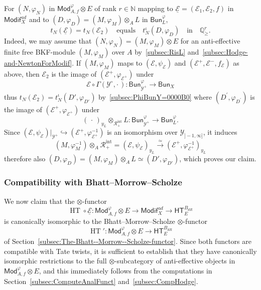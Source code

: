 \documentclass[11pt]{article}
\theoremstyle{definition}
\numberwithin{equation}{section}
\numberwithin{figure}{section}
\numberwithin{table}{section}
\newcommand{\Mod}{\mathsf{Mod}}
\newcommand{\Modif}{\mathsf{Modif}}
\newcommand{\HT}{\mathsf{HT}}
\newcommand{\Bun}{\mathsf{Bun}}
\DeclareMathOperator{\HTT}{HT}
\newcommand*{\dR}{dR}
\begin{document}
For $(N,\varphi_{N})$ in $\Mod_{A,f}^{\varphi}\otimes E$ of rank $r\in\mathbb{N}$ mapping to $\underline{\mathcal{E}}=(\mathcal{E}_{1},\mathcal{E}_{2},f)$ in $\Modif_{X}^{ad}$ and to $(D,\varphi_{D})=(M,\varphi_{M})\otimes_{A}L$ in $\Bun_{L}^{\varphi}$,
\[
t_{N}(\underline{\mathcal{E}})=t_{N}(\mathcal{E}_{2})\quad\text{equals}\quad t_{N}^{\iota}(D,\varphi_{D})\quad\text{in}\quad\mathbb{Q}_{\geq}^{r}.
\]
Indeed, we may assume that $(N,\varphi_{N})=(M,\varphi_{M})\otimes E$ for an anti-effective finite free BKF-module $(M,\varphi_{M})$ over $A$ by~\ref{subsec:RisL} and~\ref{subsec:Hodge-and-NewtonForModif}. If $(M,\varphi_{M})$ maps to $(\mathscr{E},\psi_{\mathscr{E}})$ and $(\mathscr{E}^{+},\mathscr{E}^{-},f_{\mathscr{E}})$ as above, then $\mathcal{E}_{2}$ is the image of $(\mathscr{E}^{+},\varphi_{\mathscr{E}^{+}})$ under
\[
\mathcal{E}\circ\Gamma(\mathscr{Y}^{\circ},{\cdot\,}):\Bun_{\mathscr{Y}^{+}}^{\varphi}\rightarrow\Bun_{X}
\]
thus $t_{N}(\mathcal{E}_{2})=t_{N}^{\iota}(D',\varphi_{D'})$ by~\ref{subsec:PhiBunY=0000B0} where $(D^{\prime},\varphi_{D^{\prime}})$ is the image of $(\mathscr{E}^{+},\varphi_{\mathscr{E}^{+}})$ under
\[
({\,\cdot\,})_{y_{L}}\otimes_{\mathscr{R}_{+}^{\mathrm{int}}}L:\Bun_{\mathscr{Y}^{+}}^{\varphi}\rightarrow\Bun_{L}^{\varphi}.
\]
Since $(\mathscr{E},\psi_{\mathscr{E}})\vert_{\mathscr{Y}^{+}}\hookrightarrow(\mathscr{E}^{+},\varphi_{\mathscr{E}^{+}}^{-1})$ is an isomorphism over $\mathscr{Y}_{]-1,\infty]}$, it induces
\[
(M,\varphi_{M}^{-1})\otimes_{A}\mathscr{R}_{+}^{\mathrm{int}}=(\mathscr{E},\psi_{\mathscr{E}})_{y_{L}}\stackrel{\simeq}{\longrightarrow}(\mathscr{E}^{+},\varphi_{\mathscr{E}^{+}}^{-1})_{y_{L}}
\]
therefore also $(D,\varphi_{D})=(M,\varphi_{M})\otimes_{A}L\simeq(D',\varphi_{D'})$, which proves our claim.

\subsubsection{Compatibility with Bhatt--Morrow--Scholze}\label{subsec:CompScholzeFargues}

We now claim that the $\otimes$-functor
\[
\HTT\circ\underline{\mathcal{E}}:\Mod_{A,f}^{\varphi}\otimes E\rightarrow\Modif_{X}^{ad}\rightarrow\HT_{E}^{B_{\dR}}
\]
is canonically isomorphic to the Bhatt--Morrow--Scholze $\otimes$-functor
\[
\HTT':\Mod_{A,f}^{\varphi}\otimes E\rightarrow\HT_{E}^{B_{\dR}}
\]
of Section~\ref{subsec:The-Bhatt--Morrow--Scholze-functor}. Since both functors are compatible with Tate twists, it is sufficient to establish that they have canonically isomorphic restrictions to the full $\otimes$-subcategory of anti-effective objects in $\Mod_{A,f}^{\varphi}\otimes E$, and this immediately follows from the computations in Section~\ref{subsec:ComputeAnalFunct} and~\ref{subsec:CompHodge}.
\end{document}
